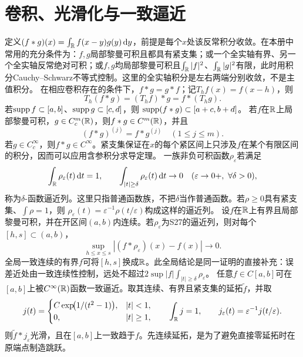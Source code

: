 \section{卷积、光滑化与一致逼近}
定义$(f*g)(x)=\int_\mathbb R f(x-y)g(y)\,\mathrm d y$，前提是每个$x$处该反常积分收敛。在本册中常用的充分条件为：$f,g$局部黎曼可积且都具有紧支集；或一个全实轴有界、另一个全实轴反常绝对可积；或$f,g$均局部黎曼可积且$\int_\mathbb R|f|^2$、$\int_\mathbb R|g|^2$有限，此时用积分Cauchy--Schwarz不等式控制。这里的全实轴积分是左右两端分别收敛，不是主值积分。
在相应卷积存在的条件下，$f*g=g*f$；记$T_hf(x)=f(x-h)$，则
\[
 T_h(f*g)=(T_hf)*g=f*(T_hg).
\]
若$\operatorname{supp} f\subset[a,b]$、$\operatorname{supp} g\subset[c,d]$，则
$\operatorname{supp}(f*g)\subset[a+c,b+d]$。
若$f$在$\mathbb R$上局部黎曼可积，$g\in C_c^m(\mathbb R)$，则$f*g\in C^m(\mathbb R)$，并且
\[
 (f*g)^{(j)}=f*g^{(j)}\quad(1\le j\le m).
\]
若$g\in C_c^\infty$，则$f*g\in C^\infty$。紧支集保证在$x$的每个紧区间上只涉及$f$在某个有限区间的积分，因而可以应用含参积分求导定理。
一族非负可积函数$\rho_\varepsilon$若满足
\[
 \int_\mathbb R\rho_\varepsilon(t)\,\mathrm d t=1,\qquad
 \int_{|t|\ge\delta}\rho_\varepsilon(t)\,\mathrm d t\to0
 \quad(\varepsilon\to0+,\ \forall\delta>0),
\]
称为$\delta$-函数逼近列。这里只指普通函数族，不把$\delta$当作普通函数。若$\rho\ge0$具有紧支集、$\int\rho=1$，则
$\rho_\varepsilon(t)=\varepsilon^{-1}\rho(t/\varepsilon)$构成这样的逼近列。
设$f$在$\mathbb R$上有界且局部黎曼可积，并在开区间$(a,b)$内连续。若$\rho_\varepsilon$为S27的逼近列，则对每个$[h,s]\subset(a,b)$，
\[
 \sup_{h\le x\le s}|(f*\rho_\varepsilon)(x)-f(x)|\longrightarrow0.
\]
全局一致连续的有界$f$可将$[h,s]$换成$\mathbb R$。此全局结论是同一证明的直接补充：误差近处由一致连续性控制，远处不超过$2\sup|f|\int_{|t|\ge\delta}\rho_\varepsilon$。
任意$f\in C[a,b]$可在$[a,b]$上被$C^\infty(\mathbb R)$函数一致逼近。取其连续、有界且紧支集的延拓$\widetilde f$，并取
\[
 j(t)=\begin{cases}C\exp\!\bigl(1/(t^2-1)\bigr),&|t|<1,\\0,&|t|\ge1,\end{cases}
 \qquad\int_\mathbb R j=1,\qquad j_\varepsilon(t)=\varepsilon^{-1}j(t/\varepsilon).
\]
则$\widetilde f*j_\varepsilon$光滑，且在$[a,b]$上一致趋于$f$。先连续延拓，是为了避免直接零延拓时在原端点制造跳跃。
